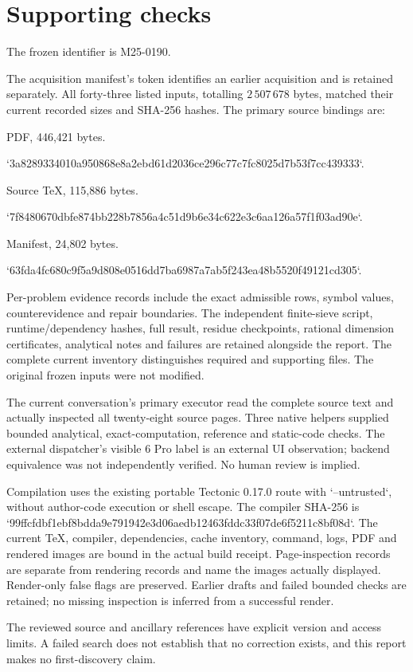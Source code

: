 \documentclass[10pt]{article}
\begin{document}
\section*{Supporting checks}
The frozen identifier is M25-0190.\par
The acquisition manifest’s token identifies an earlier acquisition and is retained separately. All forty-three listed inputs, totalling \(2\,507\,678\) bytes, matched their current recorded sizes and SHA-256 hashes. The primary source bindings are:\par
PDF, 446,421 bytes.\par
`3a8289334010a950868e8a2ebd61d2036ce296c77c7fc8025d7b53f7cc439333`.\par
Source TeX, 115,886 bytes.\par
`7f8480670dbfe874bb228b7856a4c51d9b6e34c622e3c6aa126a57f1f03ad90e`.\par
Manifest, 24,802 bytes.\par
`63fda4fc680c9f5a9d808e0516dd7ba6987a7ab5f243ea48b5520f49121cd305`.\par
Per-problem evidence records include the exact admissible rows, symbol values, counterevidence and repair boundaries. The independent finite-sieve script, runtime/dependency hashes, full result, residue checkpoints, rational dimension certificates, analytical notes and failures are retained alongside the report. The complete current inventory distinguishes required and supporting files. The original frozen inputs were not modified.\par
The current conversation’s primary executor read the complete source text and actually inspected all twenty-eight source pages. Three native helpers supplied bounded analytical, exact-computation, reference and static-code checks. The external dispatcher’s visible 6 Pro label is an external UI observation; backend equivalence was not independently verified. No human review is implied.\par
Compilation uses the existing portable Tectonic 0.17.0 route with `–untrusted`, without author-code execution or shell escape. The compiler SHA-256 is `99ffcfdbf1ebf8bdda9e791942e3d06aedb12463fddc33f07de6f5211c8bf08d`. The current TeX, compiler, dependencies, cache inventory, command, logs, PDF and rendered images are bound in the actual build receipt. Page-inspection records are separate from rendering records and name the images actually displayed. Render-only false flags are preserved. Earlier drafts and failed bounded checks are retained; no missing inspection is inferred from a successful render.\par
The reviewed source and ancillary references have explicit version and access limits. A failed search does not establish that no correction exists, and this report makes no first-discovery claim.\par
\end{document}
